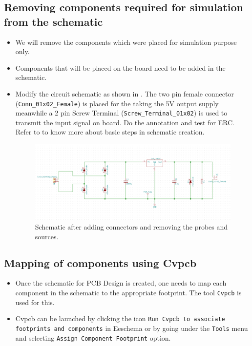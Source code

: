 

\subsection{Removing components required for simulation from the schematic}
\begin{itemize}
\item We will remove the components which were placed for simulation purpose only.
\item Components that will be placed on the board need to be added in the schematic.
\item Modify the circuit schematic as shown in . The two pin female connector (\texttt{Conn\_01x02\_Female}) is placed for the taking the 5V output supply meanwhile a 2 pin Screw Terminal (\texttt{Screw\_Terminal\_01x02}) is used to transmit the input signal on board. Do the annotation and test for ERC.  Refer to  to know more about basic steps in schematic creation. 

\begin{figure}
\centering
\includegraphics[width=\lgfig]{NGHDL/pcbschwithconn.png}
\caption{Schematic after adding connectors and removing the probes and sources.}
\label{pcbschconn}
\end{figure}
\end{itemize}

\subsection{Mapping of components using Cvpcb}
\begin{itemize}

\item Once the schematic for PCB Design is created, one needs to map each component
in the schematic to the appropriate footprint. The tool \texttt{Cvpcb} is
used for this.
\item Cvpcb can be launched by clicking the icon \texttt{Run Cvpcb to associate footprints and components} in Eeschema or by going under the \texttt{Tools} menu and selecting \texttt{Assign Component Footprint} option. 
\end{itemize}

